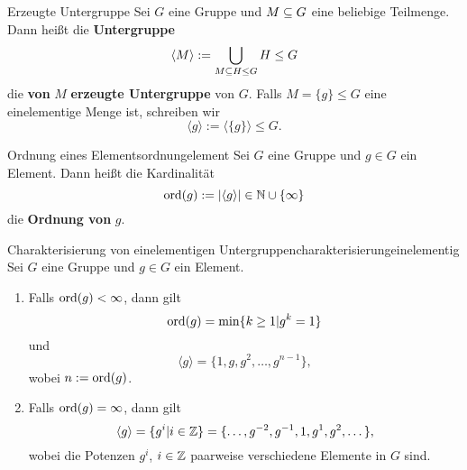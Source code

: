 \begin{definition}{Erzeugte Untergruppe}{}
Sei $G$ eine Gruppe und $M \subseteq G$ eine beliebige Teilmenge. Dann heißt die \textbf{Untergruppe}
\begin{equation}
\langle M \rangle := \bigcup_{M \subseteq H \leq G} H \leq G
\end{equation}
die \textbf{von} $M$ \textbf{erzeugte Untergruppe} von $G$. Falls $M = \{g\} \leq G$ eine einelementige Menge ist, schreiben wir \begin{equation}
\langle g \rangle := \langle \{g\} \rangle \leq G.
\end{equation}
\end{definition}
\begin{definition}{Ordnung eines Elements}{ordnungelement}
Sei $G$ eine Gruppe und $g \in G$ ein Element. Dann heißt die Kardinalität 
\begin{equation}
\text{ord}(g) := | \langle g \rangle | \in \mathbb{N} \cup \{\infty \}
\end{equation}
die \textbf{Ordnung von} $g$.
\end{definition}
\begin{satz}{Charakterisierung von einelementigen Untergruppen}{charakterisierungeinelementig}
Sei $G$ eine Gruppe und $g \in G$ ein Element.
\begin{enumerate}
\item Falls $\operatorname{\text{ord}} (g) < \infty$, dann gilt \begin{equation}
\operatorname{\text{ord}} (g) = \min \{k \geq 1 | g^k= 1\}
\end{equation}
und \begin{equation}
\langle g \rangle = \{1, g, g^2, \dots, g^{n-1} \},
\end{equation}
wobei $n := \operatorname{\text{ord}} (g)$.
\item Falls $\operatorname{\text{ord}} (g) = \infty$, dann gilt
\begin{equation}
\langle g \rangle = \{g^i | i \in \mathbb{Z} \} = \{ \dots, g^{-2}, g^{-1}, 1, g^1, g^2, \dots \},
\end{equation}
wobei die Potenzen $g^i$, $i \in \mathbb{Z}$ paarweise verschiedene Elemente in $G$ sind.
\end{enumerate}
\end{satz}
